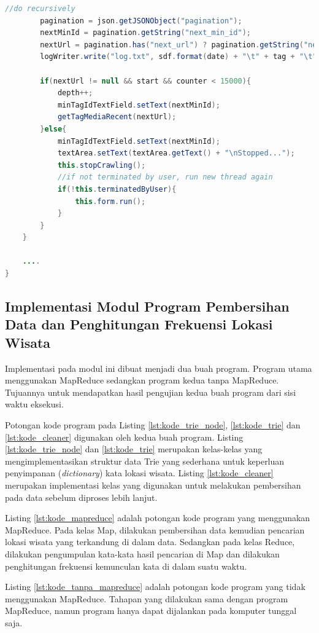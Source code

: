\begin{lstlisting}[language=Java,basicstyle=\tiny,caption=TwitterStreamer.java,label={lst:kode_instagram_crawler}]
        //do recursively
        pagination = json.getJSONObject("pagination");
        nextMinId = pagination.getString("next_min_id");
        nextUrl = pagination.has("next_url") ? pagination.getString("next_url") : null;
        logWriter.write("log.txt", sdf.format(date) + "\t" + tag + "\t" + nextMinId + "\n");

        if(nextUrl != null && start && counter < 15000){ 
            depth++;
            minTagIdTextField.setText(nextMinId);
            getTagMediaRecent(nextUrl);
        }else{
            minTagIdTextField.setText(nextMinId);
            textArea.setText(textArea.getText() + "\nStopped...");
            this.stopCrawling();
            //if not terminated by user, run new thread again
            if(!this.terminatedByUser){
                this.form.run();
            }
        }
    }
    
    ....
}
\end{lstlisting}

\subsection{Implementasi Modul Program Pembersihan Data dan Penghitungan Frekuensi Lokasi Wisata}
Implementasi pada modul ini dibuat menjadi dua buah program. Program utama menggunakan MapReduce sedangkan program kedua tanpa MapReduce. Tujuannya untuk mendapatkan hasil pengujian kedua buah program dari sisi waktu eksekusi. 

Potongan kode program pada Listing \ref{lst:kode_trie_node}, \ref{lst:kode_trie} dan \ref{lst:kode_cleaner} digunakan oleh kedua buah program. Listing \ref{lst:kode_trie_node} dan \ref{lst:kode_trie} merupakan kelas-kelas yang mengimplementasikan struktur data Trie yang sederhana untuk keperluan penyimpanan (\textit{dictionary}) kata lokasi wisata. Listing \ref{lst:kode_cleaner} merupakan implementasi kelas yang digunakan untuk melakukan pembersihan pada data sebelum diproses lebih lanjut.

Listing \ref{lst:kode_mapreduce} adalah potongan kode program yang menggunakan MapReduce. Pada kelas Map, dilakukan pembersihan data kemudian pencarian lokasi wisata yang terkandung di dalam data. Sedangkan pada kelas Reduce, dilakukan pengumpulan kata-kata hasil pencarian di Map dan dilakukan penghitungan frekuensi kemunculan kata di dalam suatu waktu.

Listing \ref{lst:kode_tanpa_mapreduce} adalah potongan kode program yang tidak menggunakan MapReduce. Tahapan yang dilakukan sama dengan program MapReduce, namun program hanya dapat dijalankan pada komputer tunggal saja.

